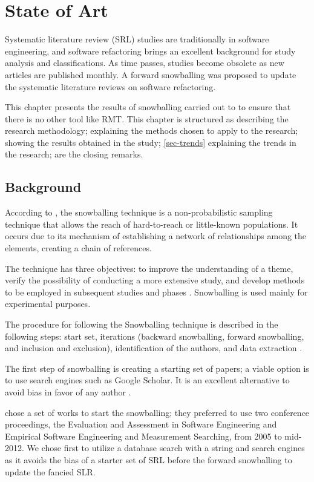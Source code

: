 \chapter{State of Art}%
\label{chap-state}

Systematic literature review (SRL) studies are traditionally in software engineering, and software refactoring brings an excellent background for study analysis and classifications. As time passes, studies become obsolete as new articles are published monthly. A forward snowballing was proposed to update the systematic literature reviews on software refactoring.

This chapter presents the results of snowballing carried out to to ensure that there is no other tool like RMT. This chapter is structured as  describing the research methodology;  explaining the methods chosen to apply to the research;  showing the results obtained in the study; \cref{sec-trends} explaining the trends in the research;  are the closing remarks.

\section{Background}
\label{sec-background}
According to \cite{bernard2006}, the snowballing technique is a non-probabilistic sampling technique that allows the reach of hard-to-reach or little-known populations. It occurs due to its mechanism of establishing a network of relationships among the elements, creating a chain of references.

The technique has three objectives: to improve the understanding of a theme, verify the possibility of conducting a more extensive study, and develop methods to be employed in subsequent studies and phases \cite{vinuto2014}. Snowballing is used mainly for experimental purposes.

The procedure for following the Snowballing technique is described in the following steps: start set, iterations (backward snowballing, forward snowballing, and inclusion and exclusion), identification of the authors, and data extraction \cite{Wohlin2014}.

The first step of snowballing is creating a starting set of papers; a viable option is to use search engines such as Google Scholar. It is an excellent alternative to avoid bias in favor of any author \cite{Wohlin2014}.

\textcite{Kitchenham2013} chose a set of works to start the snowballing; they preferred to use two conference proceedings, the Evaluation and Assessment in Software Engineering and Empirical Software Engineering and Measurement Searching, from 2005 to mid-2012. We chose first to utilize a database search with a string and search engines as it avoids the bias of a starter set of SRL before the forward snowballing to update the fancied SLR.

